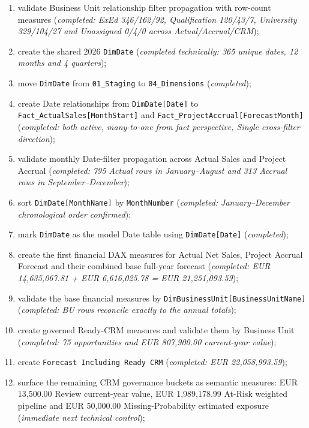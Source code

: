 \documentclass[11pt,a4paper]{article}
\begin{document}
\begin{enumerate}[leftmargin=9mm,itemsep=4pt]
    \item validate Business Unit relationship filter propagation with row-count
    measures
    (\textit{completed: ExEd 346/162/92, Qualification 120/43/7,
    University 329/104/27 and Unassigned 0/4/0 across Actual/Accrual/CRM});
    \item create the shared 2026 \texttt{DimDate}
    (\textit{completed technically: 365 unique dates, 12 months and 4 quarters});
    \item move \texttt{DimDate} from \texttt{01\_Staging} to
    \texttt{04\_Dimensions}
    (\textit{completed});
    \item create Date relationships from \texttt{DimDate[Date]} to
    \texttt{Fact\_ActualSales[MonthStart]} and
    \texttt{Fact\_ProjectAccrual[ForecastMonth]}
    (\textit{completed: both active, many-to-one from fact perspective,
    Single cross-filter direction});
    \item validate monthly Date-filter propagation across Actual Sales and
    Project Accrual
    (\textit{completed: 795 Actual rows in January--August and 313 Accrual rows
    in September--December});
    \item sort \texttt{DimDate[MonthName]} by \texttt{MonthNumber}
    (\textit{completed: January--December chronological order confirmed});
    \item mark \texttt{DimDate} as the model Date table using
    \texttt{DimDate[Date]}
    (\textit{completed});
    \item create the first financial DAX measures for Actual Net Sales,
    Project Accrual Forecast and their combined base full-year forecast
    (\textit{completed: EUR 14,635,067.81 + EUR 6,616,025.78 =
    EUR 21,251,093.59});
    \item validate the base financial measures by
    \texttt{DimBusinessUnit[BusinessUnitName]}
    (\textit{completed: BU rows reconcile exactly to the annual totals});
    \item create governed Ready-CRM measures and validate them by Business Unit
    (\textit{completed: 75 opportunities and EUR 807,900.00 current-year value});
    \item create \texttt{Forecast Including Ready CRM}
    (\textit{completed: EUR 22,058,993.59});
    \item surface the remaining CRM governance buckets as semantic measures:
    EUR 13,500.00 Review current-year value, EUR 1,989,178.99 At-Risk weighted
    pipeline and EUR 50,000.00 Missing-Probability estimated exposure
    (\textit{immediate next technical control});

\end{enumerate}
\end{document}
